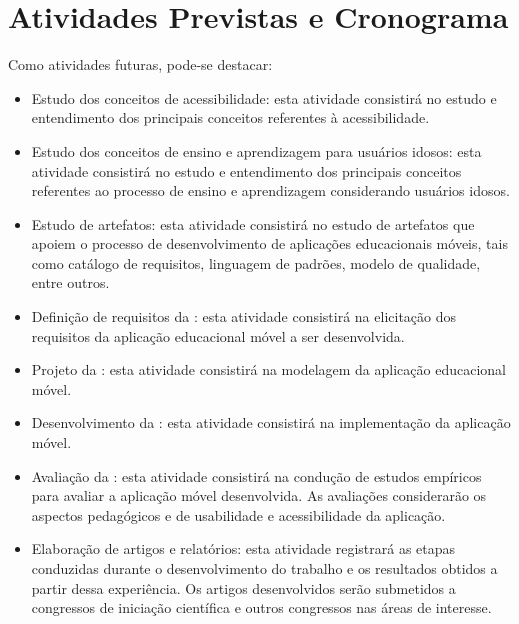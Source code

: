 \chapter{Atividades Previstas e Cronograma} \label{sec:atividades_futuras}
Como atividades futuras, pode-se destacar:
\begin{itemize}
    \item Estudo dos conceitos de acessibilidade: esta atividade consistirá no estudo e entendimento dos principais conceitos referentes à acessibilidade.
    \item Estudo dos conceitos de ensino e aprendizagem para usuários idosos: esta atividade consistirá no estudo e entendimento dos principais conceitos referentes ao processo de ensino e aprendizagem considerando usuários idosos.
    \item Estudo de artefatos: esta atividade consistirá no estudo de artefatos que apoiem o processo de desenvolvimento de aplicações educacionais móveis, tais como catálogo de requisitos, linguagem de padrões, modelo de qualidade, entre outros.
    \item Definição de requisitos da \crossword: esta atividade consistirá na elicitação dos requisitos da aplicação educacional móvel a ser desenvolvida.
    \item Projeto da \crossword: esta atividade consistirá na modelagem da aplicação educacional móvel.
    \item Desenvolvimento da \crossword: esta atividade consistirá na implementação da aplicação móvel.
    \item Avaliação da \crossword: esta atividade consistirá na condução de estudos empíricos para avaliar a aplicação móvel desenvolvida. As avaliações considerarão os aspectos pedagógicos e de usabilidade e acessibilidade da aplicação.
    \item Elaboração de artigos e relatórios: esta atividade registrará as etapas conduzidas durante o desenvolvimento do trabalho e os resultados obtidos a partir dessa experiência. Os artigos desenvolvidos serão submetidos a congressos de iniciação científica e outros congressos nas áreas de interesse.
\end{itemize}

